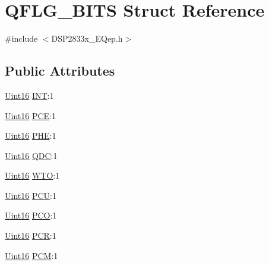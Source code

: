 \hypertarget{struct_q_f_l_g___b_i_t_s}{}\section{Q\+F\+L\+G\+\_\+\+B\+I\+T\+S Struct Reference}
\label{struct_q_f_l_g___b_i_t_s}


{\ttfamily \#include $<$D\+S\+P2833x\+\_\+\+E\+Qep.\+h$>$}

\subsection*{Public Attributes}
\begin{DoxyCompactItemize}
\item 
\hyperlink{_d_s_p2833x___device_8h_a59a9f6be4562c327cbfb4f7e8e18f08b}{Uint16} \hyperlink{struct_q_f_l_g___b_i_t_s_ad44b23620986326fa931182e223ce3ee}{I\+N\+T}\+:1
\item 
\hyperlink{_d_s_p2833x___device_8h_a59a9f6be4562c327cbfb4f7e8e18f08b}{Uint16} \hyperlink{struct_q_f_l_g___b_i_t_s_abbeb34f3b3be33cafc6d3c8a715bb554}{P\+C\+E}\+:1
\item 
\hyperlink{_d_s_p2833x___device_8h_a59a9f6be4562c327cbfb4f7e8e18f08b}{Uint16} \hyperlink{struct_q_f_l_g___b_i_t_s_a81f8a9ab1cd76741554a74acc6e7069f}{P\+H\+E}\+:1
\item 
\hyperlink{_d_s_p2833x___device_8h_a59a9f6be4562c327cbfb4f7e8e18f08b}{Uint16} \hyperlink{struct_q_f_l_g___b_i_t_s_a5fc6f9e01268e98261be1728e3c7da68}{Q\+D\+C}\+:1
\item 
\hyperlink{_d_s_p2833x___device_8h_a59a9f6be4562c327cbfb4f7e8e18f08b}{Uint16} \hyperlink{struct_q_f_l_g___b_i_t_s_aa06da50af17439bae3518a8c2bd9fee4}{W\+T\+O}\+:1
\item 
\hyperlink{_d_s_p2833x___device_8h_a59a9f6be4562c327cbfb4f7e8e18f08b}{Uint16} \hyperlink{struct_q_f_l_g___b_i_t_s_a0c966623292b28ee54753c42be3246ba}{P\+C\+U}\+:1
\item 
\hyperlink{_d_s_p2833x___device_8h_a59a9f6be4562c327cbfb4f7e8e18f08b}{Uint16} \hyperlink{struct_q_f_l_g___b_i_t_s_a7f2c178dfc78a9ee7c653c67ecc26042}{P\+C\+O}\+:1
\item 
\hyperlink{_d_s_p2833x___device_8h_a59a9f6be4562c327cbfb4f7e8e18f08b}{Uint16} \hyperlink{struct_q_f_l_g___b_i_t_s_a2b4faa60ebd3d949e3763ad550f90f07}{P\+C\+R}\+:1
\item 
\hyperlink{_d_s_p2833x___device_8h_a59a9f6be4562c327cbfb4f7e8e18f08b}{Uint16} \hyperlink{struct_q_f_l_g___b_i_t_s_ad8ccd7585da9f6f0438a35baba79603c}{P\+C\+M}\+:1

\end{DoxyCompactItemize}

